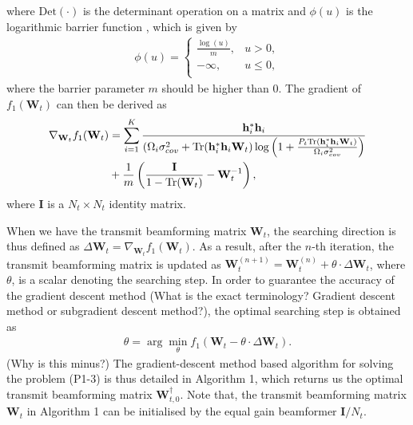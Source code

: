 \documentclass[12pt,draft,onecolumn,journal]{IEEEtran}
\begin{document}
where $\text{Det}(\cdot)$ is the determinant operation on a matrix and $\phi(u)$ is the logarithmic barrier function \cite{convex}, which is given by
\begin{align}
	\phi(u)=\left\{
	\begin{array}{ll}
		\displaystyle{\frac{\log(u)}{m}}, & u > 0, \\
		-\infty, & u \leq 0, \\
	\end{array}
	\right. \label{eq:Barrier}
\end{align}
where the barrier parameter $m$ should be higher than 0. The gradient of $f_1(\mathbf{W}_t)$ can then be derived as
\begin{align}
	\nabla_{\mathbf{W}_t}f_1(\mathbf{W}_t) & = \sum_{i=1}^K\frac{\mathbf{h}_i^*\mathbf{h}_i}{(\Omega_i\sigma_{cov}^2 + \text{Tr}(\mathbf{h}_i^*\mathbf{h}_i\mathbf{W}_t)\log\left(1 + \frac{P_t\text{Tr}(\mathbf{h}_i^*\mathbf{h}_i\mathbf{W}_t)}{\Omega_i\sigma_{cov}^2}\right)} \notag \\
& + \frac{1}{m}\left(\frac{\mathbf{I}}{1 - \text{Tr}(\mathbf{W}_t)} - \mathbf{W}_t^{-1}\right), \label{eq:GradientF1}
\end{align}
where $\mathbf{I}$ is a $N_t\times N_t$ identity matrix.

When we have the transmit beamforming matrix $\mathbf{W}_t$, the searching direction is thus defined as $\Delta \mathbf{W}_t =\nabla_{\mathbf{W}_t}f_1(\mathbf{W}_t)$. As a result, after the $n$-th iteration, the transmit beamforming matrix is updated as $\mathbf{W}_t^{(n+1)} = \mathbf{W}_t^{(n)} + \theta\cdot \Delta \mathbf{W}_t$, where $\theta$, \cbstart is a scalar denoting the searching step.  In order to guarantee the accuracy of the gradient descent method {\color{red} (What is the exact terminology? Gradient descent method or subgradient descent method?)}, the optimal searching step is obtained as
\begin{align}
	\theta = \arg \min_{\theta} f_1(\mathbf{W}_t - \theta\cdot \Delta \mathbf{W}_t). \label{eq:SearchStepF1}
\end{align}
{\color{red} (Why is this minus?)} The gradient-descent method based algorithm for solving the problem (P1-3) is thus detailed in Algorithm 1, which returns us the optimal transmit beamforming matrix $\mathbf{W}_{t,0}^{\dagger}$. Note that, the transmit beamforming matrix $\mathbf{W}_{t}$ in Algorithm 1 can be initialised by the equal gain beamformer $\mathbf{I} / N_t$.
\end{document}
